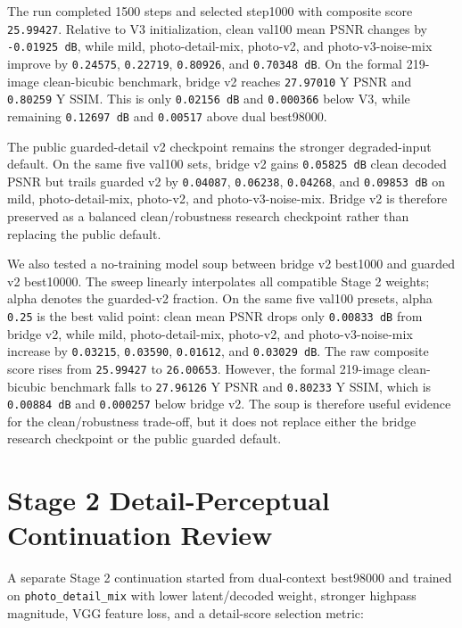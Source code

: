 \documentclass[
  10pt,
]{article}
\begin{document}
The run completed 1500 steps and selected step1000 with composite score
\texttt{25.99427}. Relative to V3 initialization, clean val100 mean PSNR
changes by \texttt{-0.01925\ dB}, while mild, photo-detail-mix,
photo-v2, and photo-v3-noise-mix improve by \texttt{0.24575},
\texttt{0.22719}, \texttt{0.80926}, and \texttt{0.70348\ dB}. On the
formal 219-image clean-bicubic benchmark, bridge v2 reaches
\texttt{27.97010} Y PSNR and \texttt{0.80259} Y SSIM. This is only
\texttt{0.02156\ dB} and \texttt{0.000366} below V3, while remaining
\texttt{0.12697\ dB} and \texttt{0.00517} above dual best98000.

The public guarded-detail v2 checkpoint remains the stronger
degraded-input default. On the same five val100 sets, bridge v2 gains
\texttt{0.05825\ dB} clean decoded PSNR but trails guarded v2 by
\texttt{0.04087}, \texttt{0.06238}, \texttt{0.04268}, and
\texttt{0.09853\ dB} on mild, photo-detail-mix, photo-v2, and
photo-v3-noise-mix. Bridge v2 is therefore preserved as a balanced
clean/robustness research checkpoint rather than replacing the public
default.

We also tested a no-training model soup between bridge v2 best1000 and
guarded v2 best10000. The sweep linearly interpolates all compatible
Stage 2 weights; alpha denotes the guarded-v2 fraction. On the same five
val100 presets, alpha \texttt{0.25} is the best valid point: clean mean
PSNR drops only \texttt{0.00833\ dB} from bridge v2, while mild,
photo-detail-mix, photo-v2, and photo-v3-noise-mix increase by
\texttt{0.03215}, \texttt{0.03590}, \texttt{0.01612}, and
\texttt{0.03029\ dB}. The raw composite score rises from
\texttt{25.99427} to \texttt{26.00653}. However, the formal 219-image
clean-bicubic benchmark falls to \texttt{27.96126} Y PSNR and
\texttt{0.80233} Y SSIM, which is \texttt{0.00884\ dB} and
\texttt{0.000257} below bridge v2. The soup is therefore useful evidence
for the clean/robustness trade-off, but it does not replace either the
bridge research checkpoint or the public guarded default.

\hypertarget{stage-2-detail-perceptual-continuation-review}{%
\section{Stage 2 Detail-Perceptual Continuation
Review}\label{stage-2-detail-perceptual-continuation-review}}

A separate Stage 2 continuation started from dual-context best98000 and
trained on \texttt{photo\_detail\_mix} with lower latent/decoded weight,
stronger highpass magnitude, VGG feature loss, and a detail-score
selection metric:
\end{document}

